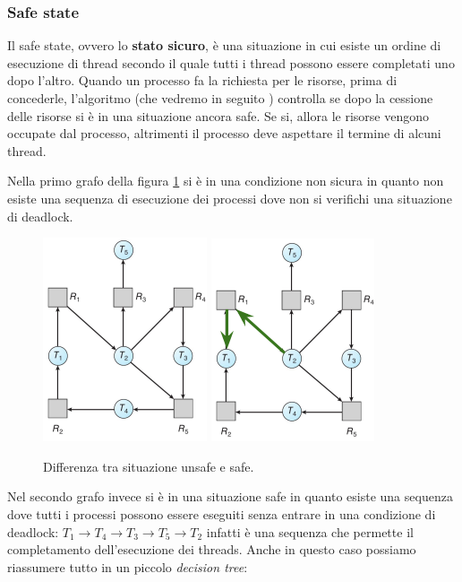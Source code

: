 \subsubsection{Safe state}
Il safe state, ovvero lo \textbf{stato sicuro}, è una situazione in cui esiste un ordine di esecuzione di thread secondo il quale tutti i thread possono essere completati uno dopo l'altro. Quando un processo fa la richiesta per le risorse, prima di concederle, l'algoritmo (che vedremo in seguito ) controlla se dopo la cessione delle risorse si è in una situazione ancora safe. Se si, allora le risorse vengono occupate dal processo, altrimenti il processo deve aspettare il termine di alcuni thread.

Nella primo grafo della figura \ref{fig:safe_unsafe} si è in una condizione non sicura in quanto non esiste una sequenza di esecuzione dei processi dove non si verifichi una situazione di deadlock. 
\begin{figure}[h]
    \centering
    \includegraphics[width = .35\textwidth]{../res/imgs/deadlocks/unsafe.png}
    \hspace{5em}
    \includegraphics[width = .35\textwidth]{../res/imgs/deadlocks/safe.png}
    \caption{Differenza tra situazione unsafe e safe.}
    \label{fig:safe_unsafe}
\end{figure}
Nel secondo grafo invece si è in una situazione safe in quanto esiste una sequenza dove tutti i processi possono essere eseguiti senza entrare in una condizione di deadlock: $T_1 \to T_4 \to T_3 \to T_5 \to T_2$ infatti è una sequenza che permette il completamento dell'esecuzione dei threads. Anche in questo caso possiamo riassumere tutto in un piccolo \textit{decision tree}:
